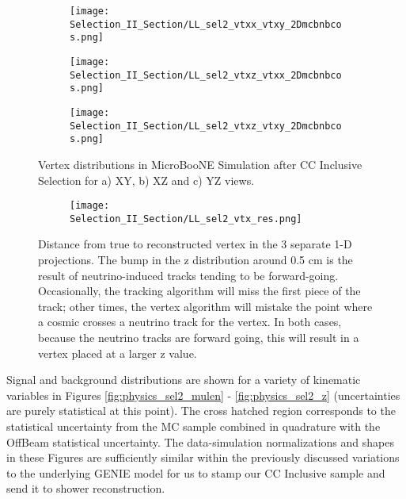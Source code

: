 \begin{figure}[h!]
\centering
  \begin{subfigure}[t]{0.26\textwidth}
    \centering
\texttt{[image: Selection\_II\_Section/LL\_sel2\_vtxx\_vtxy\_2Dmcbnbcos.png]}
    \caption{ }
  \end{subfigure} 
  \hspace{10 mm}
  \begin{subfigure}[t]{0.26\textwidth}
    \centering
\texttt{[image: Selection\_II\_Section/LL\_sel2\_vtxz\_vtxx\_2Dmcbnbcos.png]}
    \caption{ }
  \end{subfigure} 
  \hspace{10 mm}
  \begin{subfigure}[t]{0.26\textwidth}
    \centering
\texttt{[image: Selection\_II\_Section/LL\_sel2\_vtxz\_vtxy\_2Dmcbnbcos.png]}
    \caption{ }
  \end{subfigure} 
\caption{ Vertex distributions in MicroBooNE Simulation after CC Inclusive Selection for a) XY, b) XZ and c) YZ views. }
\label{fig:ll_sel2_vertices_mc}
\end{figure}


\begin{figure}[t!]
\centering
 \begin{subfigure}[t]{0.6\textwidth}
    \centering
\texttt{[image: Selection\_II\_Section/LL\_sel2\_vtx\_res.png]}
    \caption{ }
  \end{subfigure} 

\caption{Distance from true to reconstructed vertex in the 3 separate 1-D projections. The bump in the z distribution around 0.5 cm is the result of neutrino-induced tracks tending to be forward-going.  Occasionally, the tracking algorithm will miss the first piece of the track; other times, the vertex algorithm will mistake the point where a cosmic crosses a neutrino track for the vertex.  In both cases, because the neutrino tracks are forward going, this will result in a vertex placed at a larger z value.  }
\label{fig:physics_sel2_vtxres}
\end{figure}

Signal and background distributions are shown for a variety of kinematic variables in Figures \ref{fig:physics_sel2_mulen} - \ref{fig:physics_sel2_z} (uncertainties are purely statistical at this point). The cross hatched region corresponds to the statistical uncertainty from the MC sample combined in quadrature with the OffBeam statistical uncertainty.  The data-simulation normalizations and shapes in these Figures are sufficiently similar within the previously discussed variations to the underlying GENIE model for us to stamp our CC Inclusive sample and send it to shower reconstruction.


